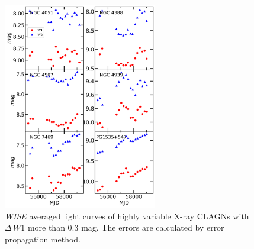 \documentclass[linenumbers]{aastex631}
\begin{document}
\begin{figure}
\centering
	\includegraphics[width=0.6\textwidth]{pic/wisename_varX.png}
    \caption{{\it WISE} averaged light curves of highly variable X-ray CLAGNs with $\Delta\,W1$ more than $0.3$ mag. The errors are calculated by error propagation method. }
    \label{fig:X-CLAGN-lc}
\end{figure}
\end{document}
